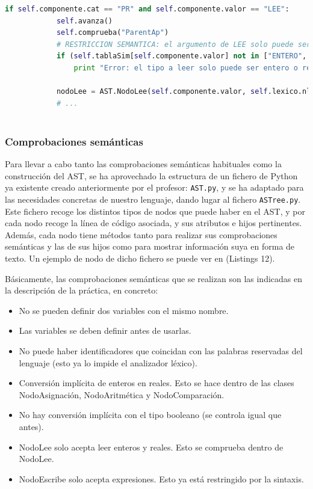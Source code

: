 \documentclass[11pt]{article}
\begin{document}
\begin{minipage}{\linewidth}
    \begin{lstlisting}[language=Python, caption=analizaInstES()]          
        if self.componente.cat == "PR" and self.componente.valor == "LEE":
            self.avanza()
            self.comprueba("ParentAp")
            # RESTRICCION SEMANTICA: el argumento de LEE solo puede ser entero o real
            if (self.tablaSim[self.componente.valor] not in ["ENTERO", "REAL"]):
                print "Error: el tipo a leer solo puede ser entero o real (instruccion LEE en linea " + str(self.componente.linea) + ")"

            nodoLee = AST.NodoLee(self.componente.valor, self.lexico.nlinea)
			# ...            
            
	\end{lstlisting}
\end{minipage}

\subsubsection{Comprobaciones semánticas}
Para llevar a cabo tanto las comprobaciones semánticas habituales como la construcción del AST, se ha aprovechado la estructura de un fichero de Python ya existente creado anteriormente por el profesor: \lstinline[language=Python]{AST.py}, y se ha adaptado para las necesidades concretas de nuestro lenguaje, dando lugar al fichero \lstinline[language=Python]{ASTree.py}. Este fichero recoge los distintos tipos de nodos que puede haber en el AST, y por cada nodo recoge la línea de código asociada, y sus atributos e hijos pertinentes. Además, cada nodo tiene métodos tanto para realizar sus comprobaciones semánticas y las de sus hijos como para mostrar información suya en forma de texto. Un ejemplo de nodo de dicho fichero se puede ver en (Listings 12).

Básicamente, las comprobaciones semánticas que se realizan son las indicadas en la descripción de la práctica, en concreto:
\begin{itemize}
	\item No se pueden definir dos variables con el mismo nombre.
	\item Las variables se deben definir antes de usarlas.
	\item No puede haber identificadores que coincidan con las palabras reservadas del lenguaje (esto ya lo impide el analizador léxico).
	\item Conversión implícita de enteros en reales. Esto se hace dentro de las clases NodoAsignación, NodoAritmética y NodoComparación.
	\item No hay conversión implícita con el tipo booleano (se controla igual que antes).
	\item NodoLee solo acepta leer enteros y reales. Esto se comprueba dentro de NodoLee.
	\item NodoEscribe solo acepta expresiones. Esto ya está restringido por la sintaxis.
\end{itemize} 
\end{document}
